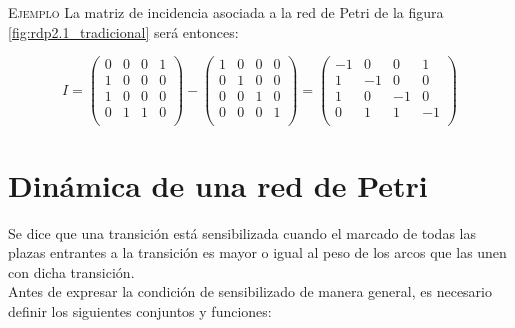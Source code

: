 \textsc{Ejemplo} La matriz de incidencia asociada a la red de Petri de la figura \ref{fig:rdp2.1_tradicional} será entonces:

\begin{equation}
    I = 
    \begin{pmatrix}
        0 & 0 & 0 & 1 \\
        1 & 0 & 0 & 0 \\
        1 & 0 & 0 & 0 \\
        0 & 1 & 1 & 0 \\
    \end{pmatrix}
    -
    \begin{pmatrix}
        1 & 0 & 0 & 0 \\
        0 & 1 & 0 & 0 \\
        0 & 0 & 1 & 0 \\
        0 & 0 & 0 & 1 \\
    \end{pmatrix}
    = 
    \begin{pmatrix}
        -1 & 0 & 0 & 1 \\
        1 & -1 & 0 & 0 \\
        1 & 0 & -1 & 0 \\
        0 & 1 & 1 & -1 \\
    \end{pmatrix}
\end{equation}


\section[Dinámica de una red de Petri]{Dinámica de una red de Petri} \label{sec:drdp}

Se dice que una transición está sensibilizada cuando el marcado de todas las plazas entrantes a la transición es mayor o igual al peso de los arcos que las unen con dicha transición.\cite{papermico}  \\
Antes de expresar la condición de sensibilizado de manera general, es necesario definir los siguientes conjuntos y funciones:

